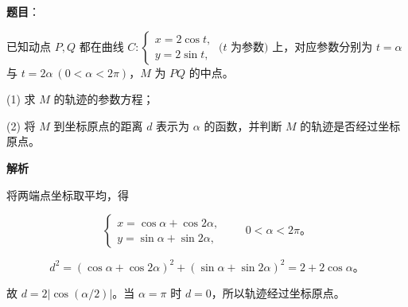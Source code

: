 \begin{answer}

\textbf{题目}：

已知动点 $P,Q$ 都在曲线 $C:\begin{cases}x=2\cos t,\\y=2\sin t,\end{cases}\ (t$ 为参数$)$ 上，对应参数分别为 $t=\alpha$ 与 $t=2\alpha\ (0<\alpha<2\pi)$，$M$ 为 $PQ$ 的中点。

(1) 求 $M$ 的轨迹的参数方程；

(2) 将 $M$ 到坐标原点的距离 $d$ 表示为 $\alpha$ 的函数，并判断 $M$ 的轨迹是否经过坐标原点。

\textbf{解析}


将两端点坐标取平均，得

\nopagebreak[4]
\[\begin{cases}x=\cos\alpha+\cos2\alpha,\\y=\sin\alpha+\sin2\alpha,\end{cases}\qquad0<\alpha<2\pi\text{。}\]


\nopagebreak[4]
\[d^2=(\cos\alpha+\cos2\alpha)^2+(\sin\alpha+\sin2\alpha)^2=2+2\cos\alpha\text{。}\]

故 $d=2|\cos(\alpha/2)|$。当 $\alpha=\pi$ 时 $d=0$，所以轨迹经过坐标原点。



\end{answer}
